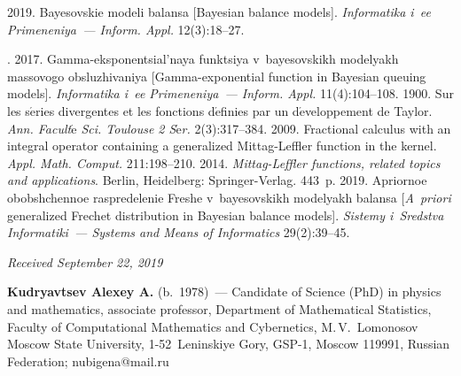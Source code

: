 \begin{multicols}{2}
{{\begin{thebibliography}{99}
 2019. 
Bayesovskie modeli balansa [Bayesian balance models]. 
\textit{Informatika i~ee Primeneniya~--- Inform. Appl.} 12(3):18--27.

. 
2017. Gamma-eksponentsial'naya funktsiya v~bayesovskikh modelyakh 
massovogo obsluzhivaniya [Gamma-exponential function in Bayesian queuing models]. 
\textit{Informatika i~ee Primeneniya~--- Inform. Appl.} 11(4):104--108.
 1900. Sur les s$\acute{\mbox{e}}$ries 
divergentes et les fonctions d$\acute{\mbox{e}}$finies par un 
d$\acute{\mbox{e}}$veloppement de Taylor. 
\textit{Ann. Facult$\acute{\mbox{e}}$ Sci. Toulouse 2 S$\acute{\mbox{e}}$r.}
2(3):317--384.
 2009. Fractional calculus with an integral operator containing a generalized 
 Mittag-Leffler function in the kernel. 
 \textit{Appl. Math. Comput.} 211:198--210.
 2014. \textit{Mittag-Leffler functions, related topics and applications}. 
 Berlin, Heidelberg: Springer-Verlag. 443~p.
 2019. Apriornoe obobshchennoe raspredelenie Freshe 
 v~bayesovskikh modelyakh balansa [\textit{A~priori} generalized Frechet distribution 
 in Bayesian balance models]. \textit{Sistemy i~Sredstva Informatiki~--- 
 Systems and Means of Informatics} 29(2):39--45.
\end{thebibliography}

 }
 }

\end{multicols}

\vspace*{-11pt}

\hfill{\small\textit{Received September 22, 2019}}


\vspace*{-19pt}

\Contrl

\vspace*{-6pt}

\noindent
\textbf{Kudryavtsev Alexey A.} (b.\ 1978)~--- 
Candidate of Science (PhD) in physics and mathematics, associate professor, 
Department of Mathematical Statistics, Faculty of Computational Mathematics 
and Cybernetics, M.\,V.~Lomonosov Moscow State University, 
1-52~Leninskiye Gory, GSP-1, Moscow 119991, Russian Federation; \mbox{nubigena@mail.ru}
\label{end\stat}

\renewcommand{\bibname}{\protect\rm Литература}  